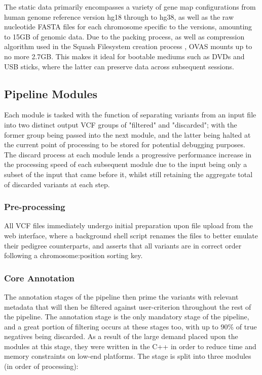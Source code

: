 \documentclass{bioinfo}
\def\app{OVAS}
\begin{document}
\begin{methods}
The static data primarily encompasses a variety of gene map configurations from human genome reference version hg18 through to hg38, as well as the raw nucleotide FASTA files for each chromosome specific to the versions, amounting to 15GB of genomic data. Due to the packing process, as well as compression algorithm used in the Squash Filesystem creation process \citep{lougher2008squashfs}, \app{} mounts up to no more 2.7GB. This makes it ideal for bootable mediums such as DVDs and USB sticks, where the latter can preserve data across subsequent sessions.



\subsection{Pipeline Modules}

Each module is tasked with the function of separating variants from an input file into two distinct output VCF groups of "filtered" and "discarded"; with the former group being passed into the next module, and the latter being halted at the current point of processing to be stored for potential debugging purposes. The discard process at each module lends a progressive performance increase in the processing speed of each subsequent module due to the input being only a subset of the input that came before it, whilst still retaining the aggregate total of discarded variants at each step.

\subsubsection{Pre-processing}

All VCF files immediately undergo initial preparation upon file upload from the web interface, where a background shell script renames the files to better emulate their pedigree counterparts, and asserts that all variants are in correct order following a chromosome:position sorting key.


\subsubsection{Core Annotation}

The annotation stages of the pipeline then prime the variants with relevant metadata that will then be filtered against user-criterion throughout the rest of the pipeline. The annotation stage is the only mandatory stage of the pipeline, and a great portion of filtering occurs at these stages too, with up to 90\% of true negatives being discarded. As a result of the large demand placed upon the modules at this stage, they were written in the C++ in order to reduce time and memory constraints on low-end platforms. The stage is split into three modules (in order of processing): 


\end{methods}
\end{document}
